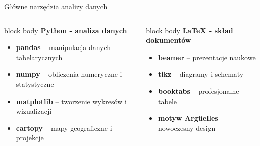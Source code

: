 \begin{frame}{Główne narzędzia analizy danych}
    \begin{columns}[T]
        \begin{column}{0.48\textwidth}
            \begin{beamercolorbox}[rounded=true, shadow=false, sep=10pt]{block body}
                \textbf{\large Python - analiza danych}
                \vspace{0.3cm}
                
                \begin{itemize}
                    \item \textbf{pandas} -- manipulacja danych tabelarycznych
                    \item \textbf{numpy} -- obliczenia numeryczne i statystyczne
                    \item \textbf{matplotlib} -- tworzenie wykresów i wizualizacji
                    \item \textbf{cartopy} -- mapy geograficzne i projekcje
                \end{itemize}
            \end{beamercolorbox}
        \end{column}
        
        \begin{column}{0.48\textwidth}
            \begin{beamercolorbox}[rounded=true, shadow=false, sep=10pt]{block body}
                \textbf{\large LaTeX - skład dokumentów}
                \vspace{0.3cm}
                
                \begin{itemize}
                    \item \textbf{beamer} -- prezentacje naukowe
                    \item \textbf{tikz} -- diagramy i schematy
                    \item \textbf{booktabs} -- profesjonalne tabele
                    \item \textbf{motyw Argüelles} -- nowoczesny design
                \end{itemize}
            \end{beamercolorbox}
        \end{column}
    \end{columns}
\end{frame}

